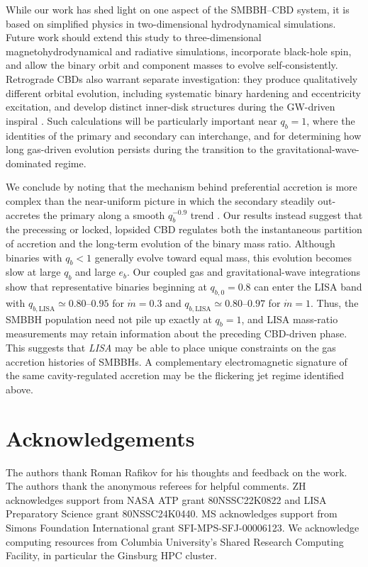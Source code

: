 \documentclass[fleqn,usenatbib]{mnras}
\begin{document}
While our work has shed light on one aspect of the SMBBH--CBD system,
it is based on simplified physics in two-dimensional hydrodynamical
simulations. Future work should extend this study to three-dimensional
magnetohydrodynamical and radiative simulations, incorporate black-hole
spin, and allow the binary orbit and component masses to evolve
self-consistently. Retrograde CBDs also warrant separate investigation:
they produce qualitatively different orbital evolution, including
systematic binary hardening and eccentricity excitation, and develop
distinct inner-disk structures during the GW-driven inspiral
\citep{oneill_2025}. 
Such calculations will be
particularly important near $q_b=1$, where the identities of the
primary and secondary can interchange, and for determining how long
gas-driven evolution persists during the transition to the
gravitational-wave-dominated regime.

We conclude by noting that the mechanism behind preferential accretion is more complex than the near-uniform picture in which the secondary steadily out-accretes the primary along a smooth $q_b^{-0.9}$ trend \citep{farris_2014, duffell_dorazio_2020, siwek_prefacc}. Our results instead suggest that the precessing or locked, lopsided CBD regulates both the instantaneous partition of accretion and the long-term evolution of the binary mass ratio. Although binaries with $q_b<1$ generally evolve toward equal mass, this evolution becomes slow at large $q_b$ and large $e_b$. Our coupled gas and gravitational-wave integrations show that representative binaries beginning at $q_{b,0}=0.8$ can enter the LISA band with $q_{b,\mathrm{LISA}}\simeq0.80$--$0.95$ for $\dot m=0.3$ and $q_{b,\mathrm{LISA}}\simeq0.80$--$0.97$ for $\dot m=1$. Thus, the SMBBH population need not pile up exactly at $q_b=1$, and LISA mass-ratio measurements may retain information about the preceding CBD-driven phase. This suggests that \textit{LISA} may be able to place unique constraints on the gas accretion histories of SMBBHs. A complementary electromagnetic signature of the same cavity-regulated accretion may be the flickering jet regime identified above.

\section*{Acknowledgements}
The authors thank Roman Rafikov for his thoughts and feedback on the work. The authors thank the anonymous referees for helpful comments. ZH acknowledges support from NASA ATP grant 80NSSC22K0822 and LISA Preparatory Science grant 80NSSC24K0440. 
MS acknowledges support from Simons Foundation International grant SFI-MPS-SFJ-00006123. 
We acknowledge computing resources from Columbia University's Shared Research Computing Facility, in particular the Ginsburg HPC cluster.
\end{document}
